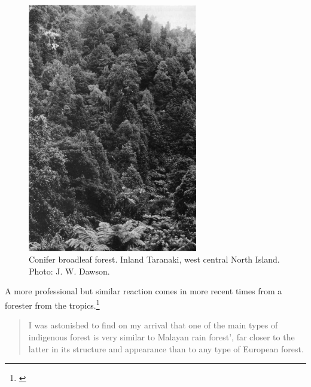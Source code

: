 \begin{figure}
	\includegraphics[width=0.66\textwidth]{graphics/fig_006}
	\centering
	\caption[Conifer broadleaf forest, inland Taranaki]{Conifer broadleaf forest.
	Inland Taranaki, west central North Island.
	Photo: J. W. Dawson.}%
	\label{fig:6conifer-broadleaf}%
\end{figure}

A more professional but similar reaction comes in more recent times from a forester from the tropics.\footnote{\cite{brown1960forester}}

\begin{quote}
	I was astonished to find on my arrival that one of the main types of indigenous forest is very similar to Malayan rain forest', far closer to the latter in its structure and appearance than to any type of European forest.
\end{quote}

